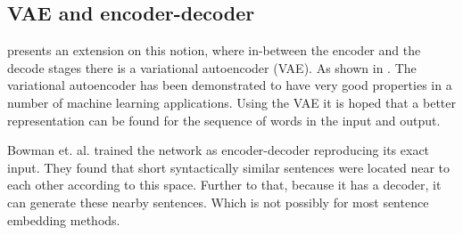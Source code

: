 \documentclass[12pt,parskip]{komatufte}
\begin{document}
\subsection{VAE and encoder-decoder}\label{sec:vae-and-encoder-decoder}
 presents an extension on this notion,
where in-between the encoder and the decode stages there is a variational autoencoder (VAE).
As shown in .
The variational autoencoder  has been demonstrated to have very good properties in a number of machine learning applications.
Using the VAE it is hoped that a better representation can be found for the sequence of words in the input and output.


Bowman et. al. trained the network as encoder-decoder reproducing its exact input.
They found that short syntactically similar sentences were located near to each other according to this space.
Further to that, because it has a decoder, it can generate these nearby sentences.
Which is not possibly for most sentence embedding methods.
\end{document}
